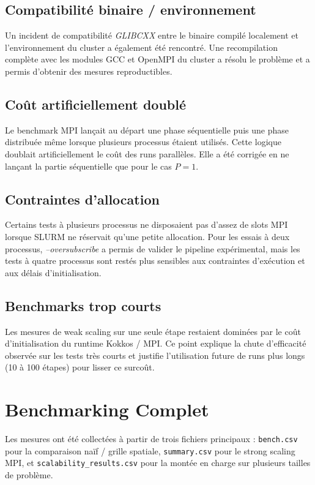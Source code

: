 \documentclass[conference]{IEEEtran}
\begin{document}
\subsection{Compatibilité binaire / environnement}
Un incident de compatibilité \textit{GLIBCXX} entre le binaire compilé localement et l'environnement du cluster a également été rencontré. Une recompilation complète avec les modules GCC et OpenMPI du cluster a résolu le problème et a permis d'obtenir des mesures reproductibles.

\subsection{Coût artificiellement doublé}
Le benchmark MPI lançait au départ une phase séquentielle puis une phase distribuée même lorsque plusieurs processus étaient utilisés. Cette logique doublait artificiellement le coût des runs parallèles. Elle a été corrigée en ne lançant la partie séquentielle que pour le cas $P = 1$.

\subsection{Contraintes d'allocation}
Certains tests à plusieurs processus ne disposaient pas d'assez de slots MPI lorsque SLURM ne réservait qu'une petite allocation. Pour les essais à deux processus, \textit{--oversubscribe} a permis de valider le pipeline expérimental, mais les tests à quatre processus sont restés plus sensibles aux contraintes d'exécution et aux délais d'initialisation.

\subsection{Benchmarks trop courts}
Les mesures de weak scaling sur une seule étape restaient dominées par le coût d'initialisation du runtime Kokkos / MPI. Ce point explique la chute d'efficacité observée sur les tests très courts et justifie l'utilisation future de runs plus longs (10 à 100 étapes) pour lisser ce surcoût.

\section{Benchmarking Complet}
Les mesures ont été collectées à partir de trois fichiers principaux : \texttt{bench.csv} pour la comparaison naïf / grille spatiale, \texttt{summary.csv} pour le strong scaling MPI, et \texttt{scalability\_results.csv} pour la montée en charge sur plusieurs tailles de problème.
\end{document}
